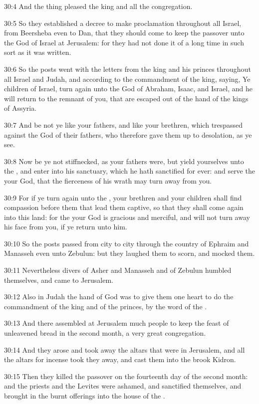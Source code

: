 30:4 And the thing pleased the king and all the congregation.

30:5 So they established a decree to make proclamation throughout all Israel, from Beersheba even to Dan, that they should come to keep the passover unto the \LORD God of Israel at Jerusalem: for they had not done it of a long time in such sort as it was written.

30:6 So the posts went with the letters from the king and his princes throughout all Israel and Judah, and according to the commandment of the king, saying, Ye children of Israel, turn again unto the \LORD God of Abraham, Isaac, and Israel, and he will return to the remnant of you, that are escaped out of the hand of the kings of Assyria.

30:7 And be not ye like your fathers, and like your brethren, which trespassed against the \LORD God of their fathers, who therefore gave them up to desolation, as ye see.

30:8 Now be ye not stiffnecked, as your fathers were, but yield yourselves unto the \LORD, and enter into his sanctuary, which he hath sanctified for ever: and serve the \LORD your God, that the fierceness of his wrath may turn away from you.

30:9 For if ye turn again unto the \LORD, your brethren and your children shall find compassion before them that lead them captive, so that they shall come again into this land: for the \LORD your God is gracious and merciful, and will not turn away his face from you, if ye return unto him.

30:10 So the posts passed from city to city through the country of Ephraim and Manasseh even unto Zebulun: but they laughed them to scorn, and mocked them.

30:11 Nevertheless divers of Asher and Manasseh and of Zebulun humbled themselves, and came to Jerusalem.

30:12 Also in Judah the hand of God was to give them one heart to do the commandment of the king and of the princes, by the word of the \LORD.

30:13 And there assembled at Jerusalem much people to keep the feast of unleavened bread in the second month, a very great congregation.

30:14 And they arose and took away the altars that were in Jerusalem, and all the altars for incense took they away, and cast them into the brook Kidron.

30:15 Then they killed the passover on the fourteenth day of the second month: and the priests and the Levites were ashamed, and sanctified themselves, and brought in the burnt offerings into the house of the \LORD.

